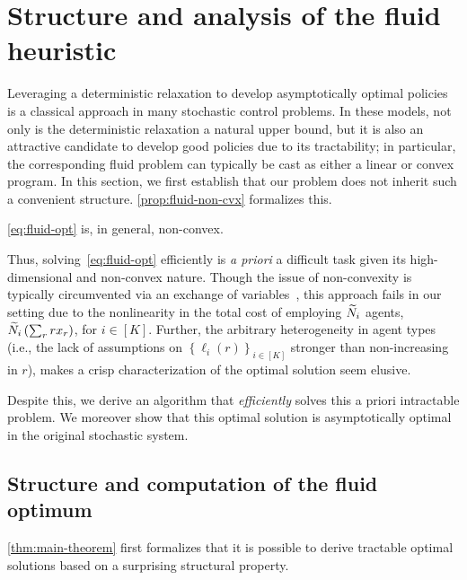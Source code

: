 \documentclass[12pt]{article}
\begin{document}
\section{Structure and analysis of the fluid heuristic}\label{sec:asymptotic-opt}

Leveraging a deterministic relaxation to develop asymptotically optimal policies is a classical approach in many stochastic control problems. 
In these models, not only is the deterministic relaxation a natural upper bound, but it is also an attractive candidate to develop good policies due to its tractability; in particular, the corresponding fluid problem can typically be cast as either a linear or convex program. In this section, we first establish that our problem does not inherit such a convenient structure. {\cref{prop:fluid-non-cvx} formalizes this.}

{
\begin{proposition}\label{prop:fluid-non-cvx}
\ref{eq:fluid-opt} is, in general, non-convex.
\end{proposition}

{Thus, solving~\ref{eq:fluid-opt} efficiently is \emph{a priori} a difficult task given its high-dimensional and non-convex nature. Though the issue of non-convexity is typically circumvented via an exchange of variables~\cite{cao2020dynamic}, this approach fails in our setting due to the nonlinearity in the total cost of employing $\widetilde{N}_i$ agents, $\widetilde{N}_i\left(\sum_r rx_r\right)$, for $i \in [K]$. Further, the arbitrary heterogeneity in agent types (i.e., the lack of assumptions on $\left\{\ell_i(r)\right\}_{i \in [K]}$ stronger than non-increasing in $r$), makes a crisp characterization of the optimal solution seem elusive.}
} Despite this, we derive an algorithm that {\it efficiently} solves this a priori intractable problem. We moreover show that this optimal solution is asymptotically optimal in the original stochastic system.

\subsection{Structure and computation of the fluid optimum}\label{ssec:fluid-structure}
 
{\cref{thm:main-theorem} first formalizes that it is possible to derive tractable optimal solutions based on a surprising structural property.}
\end{document}
